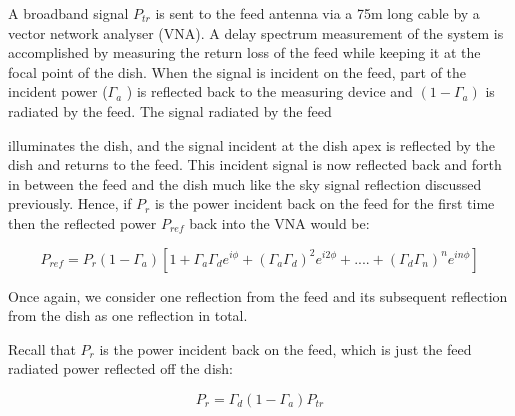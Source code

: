 \documentclass[12pt,preprint]{aastex}
\begin{document}

A broadband signal $P_{tr}$ is sent to the feed antenna via a 75m long cable by
a vector network analyser (VNA). A delay spectrum measurement of the system is
accomplished by measuring the return loss of the feed while keeping it at the
focal point of the dish.  When the signal is incident on the feed, part of the
incident power ($\Gamma_{a}$ ) is reflected back to the measuring device and
$(1-\Gamma_{a})$ is radiated by the feed. The signal radiated by the feed



illuminates the dish, and the signal incident at the dish apex is reflected by
the dish and returns to the feed. This incident signal is now reflected back
and forth in between the feed and the dish much like the sky signal reflection
discussed previously. Hence, if $P_{r}$ is the power incident back on the feed
for the first time then the reflected power $P_{ref}$ back into the VNA would
be:

\begin{equation}
P_{ref} =  P_{r}(1-\Gamma_{a}) [1+ \Gamma_{a}\Gamma_{d} e^{i\phi}+ (\Gamma_{a}\Gamma_{d})^2e^{i2\phi}+ ....+ (\Gamma_{d}\Gamma_{n})^{n}e^{in\phi}]
\end{equation}
 
Once again, we consider one reflection from the feed and its subsequent reflection from the dish as one reflection in total.

Recall that $P_{r}$ is the power incident back on the feed, which is just the feed radiated power reflected off the dish:
 
\begin{equation}
P_{r}= \Gamma_{d}(1-\Gamma_a) P_{tr}
\end{equation}
\end{document}
